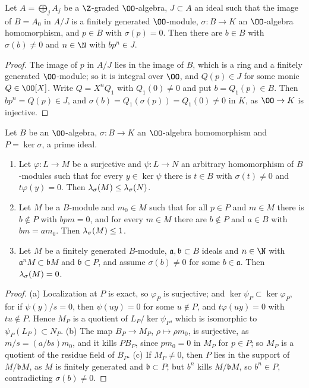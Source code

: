 \begin{lemma}\label{pf:vwin-he:nil}
Let $A=\bigoplus_jA_j$ be a $\Z$-graded $\OO$-algebra, $J\subset A$ an ideal such that the image of $B=A_0$ in $A/J$
is a finitely generated $\OO$-module, $\sigma:B\to K$ an $\OO$-algebra homomorphism, and $p\in B$ with $\sigma(p)=0$.
Then there are $b\in B$ with $\sigma(b)\ne0$ and $n\in\N$ with $bp^n\in J$.
\end{lemma}

\begin{proof}
The image of $p$ in $A/J$ lies in the image of $B$, which is a ring and a finitely generated $\OO$-module; so it is
integral over $\OO$, and $Q(p)\in J$ for some monic $Q\in\OO[X]$. Write $Q=X^nQ_1$ with $Q_1(0)\ne0$ and put
$b=Q_1(p)\in B$. Then $bp^n=Q(p)\in J$, and $\sigma(b)=Q_1(\sigma(p))=Q_1(0)\ne0$ in $K$, as $\OO\to K$ is injective.
\end{proof}

\begin{lemma}\label{pf:vwin-he:loclen}
Let $B$ be an $\OO$-algebra, $\sigma:B\to K$ an $\OO$-algebra homomorphism and $P=\ker\sigma$, a prime ideal.
\begin{enumerate}[label=(\alph*)]
\item\label{pf:vwin-he:loclen-surj} Let $\varphi:L\to M$ be a surjective and $\psi:L\to N$ an arbitrary homomorphism
of $B$-modules such that for every $y\in\ker\psi$ there is $t\in B$ with $\sigma(t)\ne0$ and $t\varphi(y)=0$. Then
$\lambda_\sigma(M)\le\lambda_\sigma(N)$.
\item\label{pf:vwin-he:loclen-one} Let $M$ be a $B$-module and $m_0\in M$ such that for all $p\in P$ and $m\in M$
there is $b\notin P$ with $bpm=0$, and for every $m\in M$ there are $b\notin P$ and $a\in B$ with $bm=am_0$. Then
$\lambda_\sigma(M)\le1$.
\item\label{pf:vwin-he:loclen-zero} Let $M$ be a finitely generated $B$-module, $\mathfrak a,\mathfrak b\subset B$
ideals and $n\in\N$ with $\mathfrak a^nM\subset\mathfrak bM$ and $\mathfrak b\subset P$, and assume $\sigma(b)\ne0$ for
some $b\in\mathfrak a$. Then $\lambda_\sigma(M)=0$.
\end{enumerate}
\end{lemma}

\begin{proof}
(a) Localization at $P$ is exact, so $\varphi_P$ is surjective; and $\ker\psi_P\subset\ker\varphi_P$, for if
$\psi(y)/s=0$, then $\psi(uy)=0$ for some $u\notin P$, and $t\varphi(uy)=0$ with $tu\notin P$. Hence $M_P$ is a
quotient of $L_P/\ker\psi_P$, which is isomorphic to $\psi_P(L_P)\subset N_P$. (b) The map $B_P\to M_P$,
$\rho\mapsto\rho m_0$, is surjective, as $m/s=(a/bs)m_0$, and it kills $PB_P$, since $pm_0=0$ in $M_P$ for $p\in P$;
so $M_P$ is a quotient of the residue field of $B_P$. (c) If $M_P\ne0$, then $P$ lies in the support of
$M/\mathfrak bM$, as $M$ is finitely generated and $\mathfrak b\subset P$; but $b^n$ kills $M/\mathfrak bM$, so
$b^n\in P$, contradicting $\sigma(b)\ne0$.
\end{proof}

